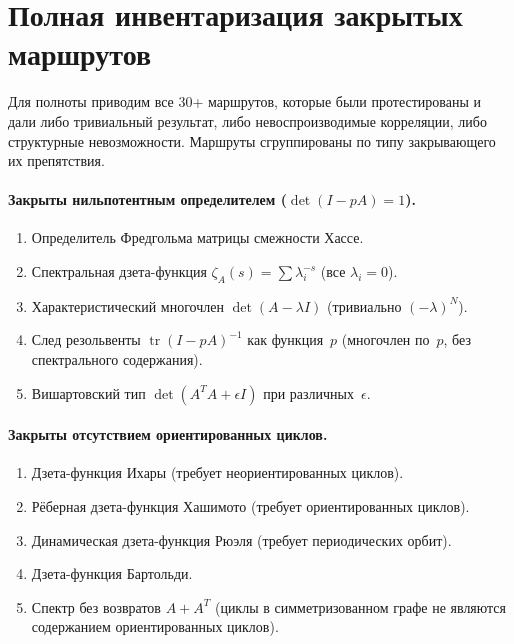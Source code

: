 \documentclass[12pt,a4paper]{article}
\theoremstyle{plain}
\theoremstyle{definition}
\theoremstyle{remark}
\newcommand{\tr}{\operatorname{tr}}
\begin{document}
\section{Полная инвентаризация закрытых маршрутов}
\label{app:routes}

Для полноты приводим все 30+ маршрутов, которые были
протестированы и дали либо тривиальный результат, либо
невоспроизводимые корреляции, либо структурные
невозможности.  Маршруты сгруппированы по типу закрывающего
их препятствия.

\paragraph{Закрыты нильпотентным определителем
($\det(I - pA) = 1$).}
\begin{enumerate}
\item Определитель Фредгольма матрицы смежности Хассе.
\item Спектральная дзета-функция
  $\zeta_A(s) = \sum \lambda_i^{-s}$
  (все $\lambda_i = 0$).
\item Характеристический многочлен $\det(A - \lambda I)$
  (тривиально $(-\lambda)^N$).
\item След резольвенты $\tr(I - pA)^{-1}$ как функция~$p$
  (многочлен по~$p$, без спектрального содержания).
\item Вишартовский тип $\det(A^T A + \epsilon I)$ при
  различных~$\epsilon$.
\end{enumerate}

\paragraph{Закрыты отсутствием ориентированных циклов.}
\begin{enumerate}[resume]
\item Дзета-функция Ихары (требует неориентированных циклов).
\item Рёберная дзета-функция Хашимото (требует
  ориентированных циклов).
\item Динамическая дзета-функция Рюэля (требует
  периодических орбит).
\item Дзета-функция Бартольди.
\item Спектр без возвратов $A + A^T$ (циклы в
  симметризованном графе не являются содержанием
  ориентированных циклов).
\end{enumerate}
\end{document}
